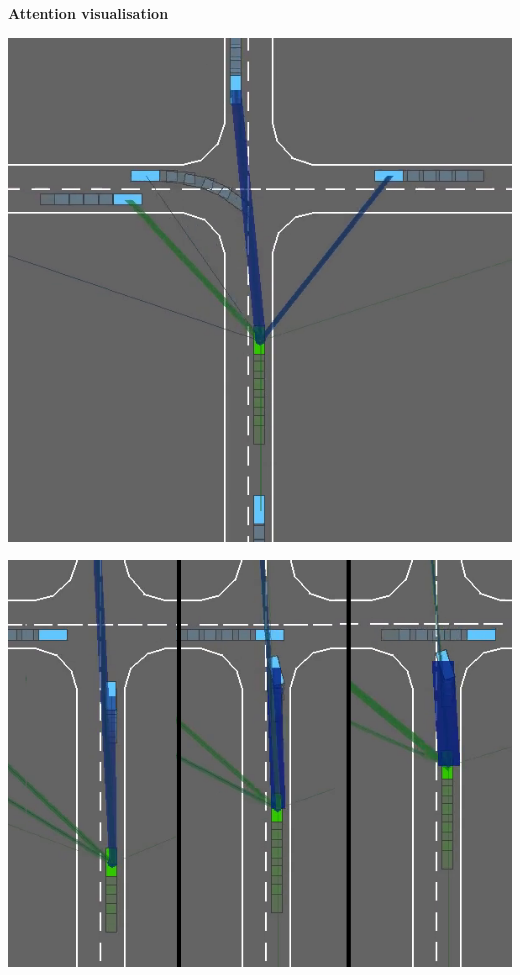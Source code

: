 \documentclass[a0paper,portrait,fontscale=0.3, margin=2cm]{baposter}
\begin{document}
\begin{poster}
{\begin{center}
\textbf{Attention visualisation}

\begin{minipage}[b]{0.26\textwidth}
\includegraphics[width=\linewidth]{../img/head_specialization}
\end{minipage}
\begin{minipage}[b]{0.28\textwidth}
	\includegraphics[width=\linewidth]{../img/distances}

\end{minipage}
\end{center}}
\end{poster}
\end{document}
